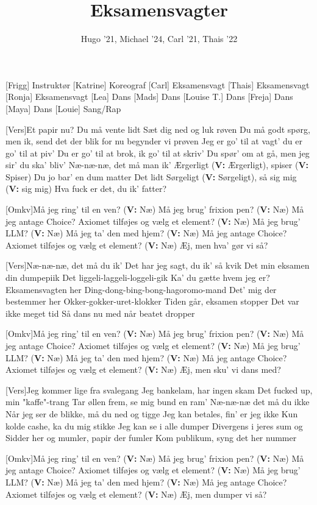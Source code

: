 \documentclass[a4paper,11pt]{article}
\title{Eksamensvagter}
\author{Hugo '21, Michael '24, Carl '21, Thais '22}
\begin{document}
\maketitle

\begin{roles}
[Frigg] Instruktør
[Katrine] Koreograf
[Carl] Eksamensvagt
[Thais] Eksamensvagt
[Ronja] Eksamensvagt
[Lea] Dans
[Mads] Dans
[Louise T.] Dans
[Freja] Dans
[Maya] Dans
[Louie] Sang/Rap
\end{roles}

\begin{song}
[Vers]Et papir nu? Du må vente lidt
Sæt dig ned og luk røven
Du må godt spørg, men ik, send det der blik
for nu begynder vi prøven
Jeg er go' til at vagt' du er go' til at piv'
Du er go' til at brok, ik go' til at skriv'
Du spør' om at gå, men jeg sir' du ska' bliv'
Næ-næ-næ, det må man ik'
Ærgerligt (\textbf{V:} Ærgerligt), spiser (\textbf{V:} Spiser)
Du jo bar' en dum matter
Det lidt Sørgeligt (\textbf{V:} Sørgeligt), så sig mig (\textbf{V:} sig mig) 
Hva fuck er det, du ik' fatter?

[Omkv]Må jeg ring' til en ven? (\textbf{V:} Næ)
Må jeg brug' frixion pen? (\textbf{V:} Næ)
Må jeg antage Choice? Axiomet tilføjes
og vælg et element? (\textbf{V:} Næ)
Må jeg brug' LLM? (\textbf{V:} Næ)
Må jeg ta' den med hjem? (\textbf{V:} Næ)
Må jeg antage Choice? Axiomet tilføjes
og vælg et element? (\textbf{V:} Næ)
Æj, men hva' gør vi så?

[Vers]Næ-næ-næ, det må du ik'
Det har jeg sagt, du ik' så kvik
Det min eksamen din dumpepiik
Det liggeli-laggeli-loggeli-gik
Ka' du gætte hvem jeg er?
Eksamensvagten her
Ding-dong-bing-bong-hagoromo-mand
Det' mig der bestemmer her
Okker-gokker-uret-klokker
Tiden går, eksamen stopper
Det var ikke meget tid
Så dans nu med når beatet dropper

[Omkv]Må jeg ring' til en ven? (\textbf{V:} Næ)
Må jeg brug' frixion pen? (\textbf{V:} Næ)
Må jeg antage Choice? Axiomet tilføjes
og vælg et element? (\textbf{V:} Næ)
Må jeg brug' LLM? (\textbf{V:} Næ)
Må jeg ta' den med hjem? (\textbf{V:} Næ)
Må jeg antage Choice? Axiomet tilføjes
og vælg et element? (\textbf{V:} Næ)
 Æj, men sku' vi dans med?

[Vers]Jeg kommer lige fra svalegang
Jeg bankelam, har ingen skam
Det fucked up, min "kaffe"-trang
Tar øllen frem, se mig bund en ram'
Næ-næ-næ det må du ikke
Når jeg ser de blikke, må du ned og tigge  
Jeg kan betales, fin' er jeg ikke
Kun kolde cashe, ka du mig stikke
Jeg kan se i alle dumper
Divergens i jeres sum og 
Sidder her og mumler, papir der fumler
Kom publikum, syng det her nummer

[Omkv]Må jeg ring' til en ven? (\textbf{V:} Næ)
Må jeg brug' frixion pen? (\textbf{V:} Næ)
Må jeg antage Choice? Axiomet tilføjes
og vælg et element? (\textbf{V:} Næ)
Må jeg brug' LLM? (\textbf{V:} Næ)
Må jeg ta' den med hjem? (\textbf{V:} Næ)
Må jeg antage Choice? Axiomet tilføjes
og vælg et element? (\textbf{V:} Næ)
 Æj, men dumper vi så?
\end{song}
\end{document}
